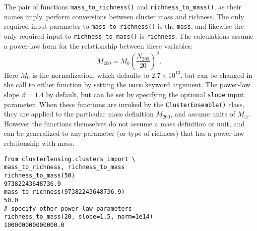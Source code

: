 \documentclass[twocolumn]{aastex6}
\newcommand{\code}{\lstinline[style=codeintext]}
\begin{document}
The pair of functions \code{mass_to_richness()} and \code{richness_to_mass()}, as their names imply, perform conversions between cluster mass and richness. The only required input parameter to \code{mass_to_richness()} is the \code{mass}, and likewise the only required input to \code{richness_to_mass()} is \code{richness}. The calculations assume a power-law form for the relationship between these variables:
\begin{equation}\label{massrich}
M_{200} = M_0 \left( \frac{N_{200}}{20} \right) ^ \beta.
\end{equation}
Here $M_0$ is the normalization, which defaults to $2.7 \times 10^{13}$, but can be changed in the call to either function by setting the \code{norm} keyword argument. The power-law slope $\beta = 1.4$ by default, but can be set by specifying the optional \code{slope} input parameter. When these functions are invoked by the \code{ClusterEnsemble()} class, they are applied to the particular mass definition $M_{200}$, and assume units of $M_{\odot}$. However the functions themselves do not assume a mass definition or unit, and can be generalized to any parameter (or type of richness) that has a power-law relationship with mass.
\begin{lstlisting}
from clusterlensing.clusters import \
mass_to_richness, richness_to_mass
richness_to_mass(50)
97382243648736.9
mass_to_richness(97382243648736.9)
50.0
# specify other power-law parameters
richness_to_mass(20, slope=1.5, norm=1e14)
100000000000000.0
\end{lstlisting}
\end{document}
